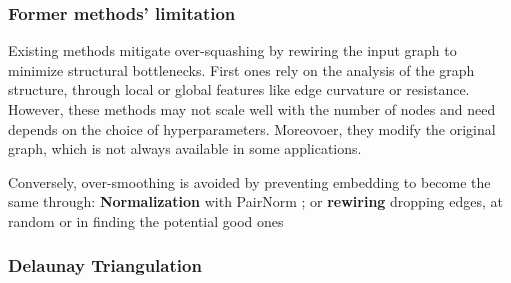 \documentclass{article}
\theoremstyle{plain}
\theoremstyle{definition}
\theoremstyle{remark}
\begin{document}
\subsubsection{Former methods' limitation}
Existing methods mitigate over-squashing by rewiring
the input graph to minimize structural bottlenecks. 
First ones rely on the analysis of the graph structure, through local or global features
like edge curvature or resistance. However, these methods may not scale well with 
the number of nodes and need depends on the choice of hyperparameters. 
Moreovoer, they modify the original graph, which is not always available in some applications.

Conversely, over-smoothing is avoided by preventing embedding to become the same 
through: \textbf{Normalization} with PairNorm \cite{zhao2020pairnorm}; 
or \textbf{rewiring} dropping edges, at random \cite{rong2019dropedge} 
or in finding the potential good ones \cite{Giraldo_2023}

\subsubsection{Delaunay Triangulation}
\end{document}
